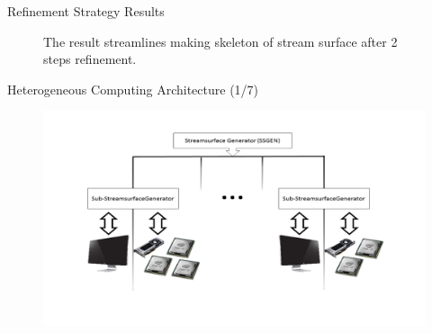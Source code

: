 \documentclass{beamer}
\begin{document}
\begin{frame}{Refinement Strategy Results}
	\begin{figure}
		\centering
		\caption{The result streamlines making skeleton of stream surface after 2 steps refinement.}
	\end{figure}
\end{frame}

\begin{frame}{Heterogeneous Computing Architecture (1/7)}
	\begin{figure}
		\includegraphics[width=\linewidth]{figures/MAarch1.PNG}
	\end{figure}
\end{frame}
\end{document}
